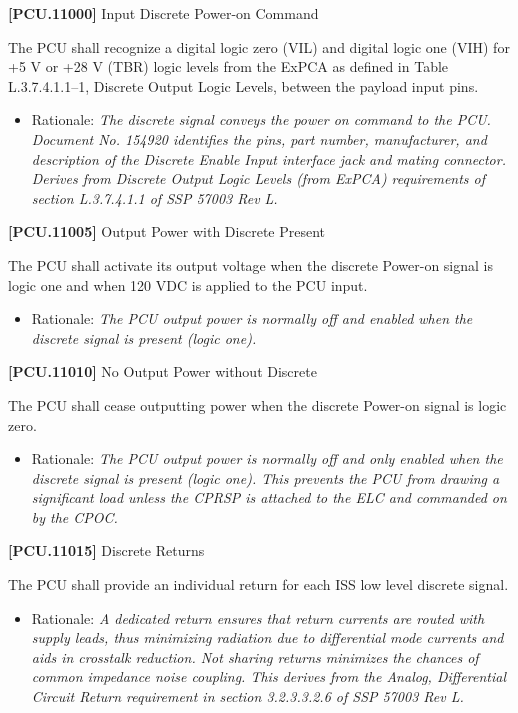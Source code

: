 \textbf{[PCU.11000]} Input Discrete Power-on Command

The \gls{PCU} shall recognize a digital logic zero (VIL) and digital logic one (VIH) for +5 V or +28 V (TBR\label{tbx_5}) logic levels from the ExPCA as defined in Table L.3.7.4.1.1--1, Discrete Output Logic Levels, between the payload input pins.

\begin{itemize}
\item{} Rationale: \emph{The discrete signal conveys the power on command to the PCU. Document No. 154920 identifies the pins, part number, manufacturer, and description of the Discrete Enable Input interface jack and mating connector. Derives from Discrete Output Logic Levels (from ExPCA) requirements of section L.3.7.4.1.1 of SSP 57003 Rev L.}

\end{itemize}

\textbf{[PCU.11005]} Output Power with Discrete Present

The \gls{PCU} shall activate its output voltage when the discrete Power-on signal is logic one and when 120 \gls{VDC} is applied to the \gls{PCU} input.

\begin{itemize}
\item{} Rationale: \emph{The PCU output power is normally off and enabled when the discrete signal is present (logic one).}

\end{itemize}

\textbf{[PCU.11010]} No Output Power without Discrete

The \gls{PCU} shall cease outputting power when the discrete Power-on signal is logic zero.

\begin{itemize}
\item{} Rationale: \emph{The PCU output power is normally off and only enabled when the discrete signal is present (logic one). This prevents the PCU from drawing a significant load unless the CPRSP is attached to the ELC and commanded on by the CPOC.}

\end{itemize}

\textbf{[PCU.11015]} Discrete Returns

The \gls{PCU} shall provide an individual return for each \gls{ISS} low level discrete signal.

\begin{itemize}
\item{} Rationale: \emph{A dedicated return ensures that return currents are routed with supply leads, thus minimizing radiation due to differential mode currents and aids in crosstalk reduction. Not sharing returns minimizes the chances of common impedance noise coupling. This derives from the Analog, Differential Circuit Return requirement in section 3.2.3.3.2.6 of SSP 57003 Rev L.}

\end{itemize}

